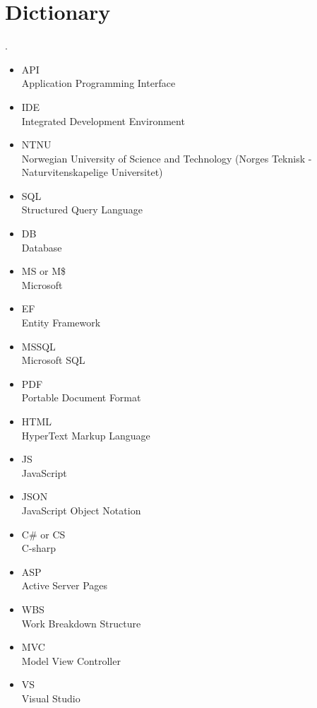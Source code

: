 \section{Dictionary}.
\begin{itemize}
\item API \\ Application Programming Interface
\item IDE \\ Integrated Development Environment
\item NTNU \\ Norwegian University of Science and Technology (Norges Teknisk - Naturvitenskapelige Universitet)
\item SQL \\ Structured Query Language 
\item DB \\ Database 
\item MS or M\$ \\ Microsoft
\item EF \\ Entity Framework
\item MSSQL \\ Microsoft SQL
\item PDF \\ Portable Document Format
\item HTML \\ HyperText Markup Language
\item JS \\ JavaScript
\item JSON \\ JavaScript Object Notation
\item C\# or CS\\ C-sharp
\item ASP \\ Active Server Pages
\item WBS \\ Work Breakdown Structure
\item MVC \\ Model View Controller
\item VS \\ Visual Studio
\end{itemize}




